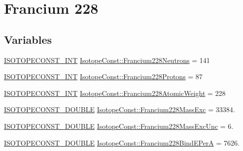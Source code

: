 \hypertarget{group___isotope_const-_francium-_fr228}{}\section{Francium 228}
\label{group___isotope_const-_francium-_fr228}
\subsection*{Variables}
\begin{DoxyCompactItemize}
\item 
\mbox{\hyperlink{group___isotope_const-_macros_ga5f18360b3e99483a35c32d789e62621c}{I\+S\+O\+T\+O\+P\+E\+C\+O\+N\+S\+T\+\_\+\+I\+NT}} \mbox{\hyperlink{group___isotope_const-_francium-_fr228_gaa94d4bb05d1c2cbd4bc67aff13b17702}{Isotope\+Const\+::\+Francium228\+Neutrons}} = 141
\item 
\mbox{\hyperlink{group___isotope_const-_macros_ga5f18360b3e99483a35c32d789e62621c}{I\+S\+O\+T\+O\+P\+E\+C\+O\+N\+S\+T\+\_\+\+I\+NT}} \mbox{\hyperlink{group___isotope_const-_francium-_fr228_gaa3f854fbf0303e0e63800bcf5dcf2803}{Isotope\+Const\+::\+Francium228\+Protons}} = 87
\item 
\mbox{\hyperlink{group___isotope_const-_macros_ga5f18360b3e99483a35c32d789e62621c}{I\+S\+O\+T\+O\+P\+E\+C\+O\+N\+S\+T\+\_\+\+I\+NT}} \mbox{\hyperlink{group___isotope_const-_francium-_fr228_gad6df93887608bb7ac4b86e529f8dc3a0}{Isotope\+Const\+::\+Francium228\+Atomic\+Weight}} = 228
\item 
\mbox{\hyperlink{group___isotope_const-_macros_ga8f45a7272ce02c0b4c65c44636ed719a}{I\+S\+O\+T\+O\+P\+E\+C\+O\+N\+S\+T\+\_\+\+D\+O\+U\+B\+LE}} \mbox{\hyperlink{group___isotope_const-_francium-_fr228_ga8e74dfd426c3e7320879a90db9031702}{Isotope\+Const\+::\+Francium228\+Mass\+Exc}} = 33384.
\item 
\mbox{\hyperlink{group___isotope_const-_macros_ga8f45a7272ce02c0b4c65c44636ed719a}{I\+S\+O\+T\+O\+P\+E\+C\+O\+N\+S\+T\+\_\+\+D\+O\+U\+B\+LE}} \mbox{\hyperlink{group___isotope_const-_francium-_fr228_gabd20ce315492c3f0a0e1e65393b97ac4}{Isotope\+Const\+::\+Francium228\+Mass\+Exc\+Unc}} = 6.
\item 
\mbox{\hyperlink{group___isotope_const-_macros_ga8f45a7272ce02c0b4c65c44636ed719a}{I\+S\+O\+T\+O\+P\+E\+C\+O\+N\+S\+T\+\_\+\+D\+O\+U\+B\+LE}} \mbox{\hyperlink{group___isotope_const-_francium-_fr228_ga02119326807fd31c9864a75e023d3c41}{Isotope\+Const\+::\+Francium228\+Bind\+E\+PerA}} = 7626.
\item 

\end{DoxyCompactItemize}
